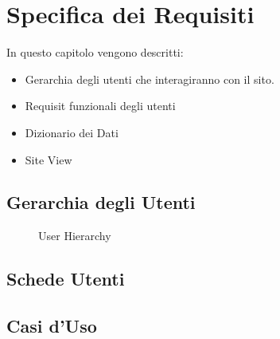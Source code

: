 \chapter{Specifica dei Requisiti}\label{ch:requirements}
In questo capitolo vengono descritti:
\begin{itemize}
  \item Gerarchia degli utenti che interagiranno con il sito.
  \item Requisit funzionali degli utenti
  \item Dizionario dei Dati
  \item Site View
\end{itemize}

\section{Gerarchia degli Utenti}\label{sec:user_hierarchy}

\begin{figure}[H]
  \centering
  
  \caption{User Hierarchy}
\end{figure}

\section{Schede Utenti}\label{sec:users}







\newpage
\section{Casi d'Uso}\label{sec:use_cases}


